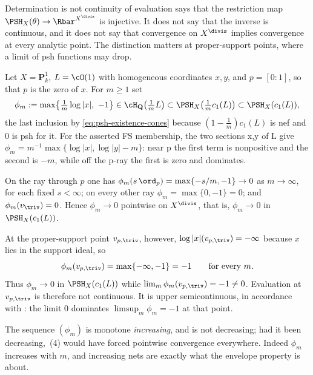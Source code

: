 \begin{warning}{Determination is not continuity of evaluation}
 says that the restriction map
$\PSH_X(\theta)\to\Rbar^{X^{\divis}}$ is injective.  It does not say that
the inverse is continuous, and it does not say that convergence on
$X^{\divis}$ implies convergence at every analytic point.  The distinction
matters at proper-support points, where a limit of psh functions may drop.
\end{warning}

\begin{example}
\label{ex:ch35-evaluation-discontinuous}
Let $X=\mathbf P^1_k$, $L=\cO(1)$ with homogeneous coordinates
$x,y$, and $p=[0:1]$, so that $p$ is the zero of $x$.  For
$m\geq1$ set
\[
 \phi_m:=\max\bigl\{\tfrac1m\log|x|,\ -1\bigr\}
 \in\cH_{\mathbf Q}\bigl(\tfrac1mL\bigr)
 \subset\PSH_X\bigl(\tfrac1m c_1(L)\bigr)
 \subset\PSH_X(c_1(L)),
\]
the last inclusion by \eqref{eq:psh-existence-cones} because
$(1-\tfrac1m)c_1(L)$ is nef and $0$ is psh for it.
For the asserted FS membership, the two sections x,y of L give
$\phi_m=m^{-1}\max\{\log|x|,\log|y|-m\}$: near p the
first term is nonpositive and the second is $-m$, while off the p-ray
the first is zero and dominates.

On the ray through $p$ one has
$\phi_m(s\,\ord_p)=\max\{-s/m,-1\}\to0$ as $m\to\infty$, for each fixed
$s<\infty$; on every other ray $\phi_m=\max\{0,-1\}=0$; and
$\phi_m(v_{\triv})=0$.  Hence $\phi_m\to0$ pointwise on
$X^{\divis}$, that is, $\phi_m\to0$ in $\PSH_X(c_1(L))$.

At the proper-support point $v_{p,\triv}$, however,
$\log|x|(v_{p,\triv})=-\infty$ because $x$ lies in the support ideal,
so
\[
 \phi_m(v_{p,\triv})=\max\{-\infty,-1\}=-1
 \qquad\text{for every }m .
\]
Thus $\phi_m\to0$ in $\PSH_X(c_1(L))$ while
$\lim_m\phi_m(v_{p,\triv})=-1\neq0$.  Evaluation at
$v_{p,\triv}$ is therefore not continuous.  It is upper semicontinuous, in
accordance with \cite[Corollary~4.29]{BJ22}: the limit $0$ dominates
$\limsup_m\phi_m=-1$ at that point.

The sequence $(\phi_m)$ is monotone \emph{increasing}, and is not
decreasing; had it been decreasing,
\,(4) would have forced pointwise
convergence everywhere.  Indeed $\phi_m$ increases with $m$, and
increasing nets are exactly what the envelope property is about.
\end{example}

